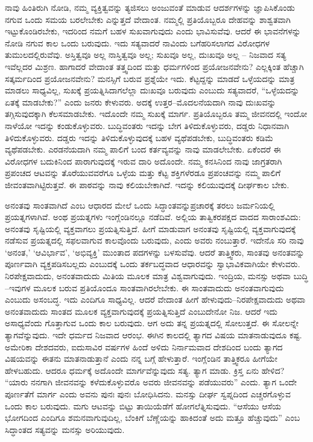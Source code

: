 ನಾವು ಹಿಂತಿರುಗಿ ನೋಡಿ, ನಮ್ಮ ವ್ಯಕ್ತಿತ್ವವನ್ನು ತ್ಯಜಿಸಲು ಅಂಜುವಂತೆ ಮಾಡುವ ಆದರ್ಶಗಳನ್ನು ಜ್ಞಾಪಿಸಿಕೊಂಡು ನಗುವ ಒಂದು ಸಮಯ ಬರಲೇಬೇಕು ಎನ್ನುತ್ತದೆ ವೇದಾಂತ. ನಮ್ಮಲ್ಲಿ ಪ್ರತಿಯೊಬ್ಬರೂ ದೇಹವನ್ನು ಶಾಶ್ವತವಾಗಿ ಇಟ್ಟುಕೊಂಡಿರಬೇಕು, ಇದರಿಂದ ನಮಗೆ ಬಹಳ ಸುಖವಾಗುವುದು ಎಂದು ಭಾವಿಸುವೆವು. ಆದರೆ ಈ ಭಾವನೆಗಳನ್ನು ನೋಡಿ ನಗುವ ಕಾಲ ಒಂದು ಬರುವುದು. ಇದು ಸತ್ಯವಾದರೆ ನಾವಿಂದು ಬಗೆಹರಿಸಲಾಗದ ವಿರೋಧಗಳ ತುಮುಲದಲ್ಲಿರುವೆವು. ಅಸ್ತಿತ್ವವೂ ಅಲ್ಲ ನಾಸ್ತಿತ್ವವೂ ಅಲ್ಲ; ಸುಖವೂ ಅಲ್ಲ, ದುಃಖವೂ ಅಲ್ಲ – ನಿಜವಾದ ಸತ್ಯ ಇವೆಲ್ಲದರ ಮಿಶ್ರಣ. ಹಾಗಾದರೆ ವೇದಾಂತ ತತ್ತ್ವದಿಂದ ಮತ್ತು ಧರ್ಮಗಳಿಂದ ಪ್ರಯೋಜನವೇನು? ಎಲ್ಲಕ್ಕಿಂತ ಹೆಚ್ಚಾಗಿ ಸತ್ಕರ್ಮದಿಂದ ಪ್ರಯೋಜನವೇನು? ಮನಸ್ಸಿಗೆ ಬರುವ ಪ್ರಶ್ನೆಯೇ ಇದು. ಕೆಟ್ಟದ್ದನ್ನು ಮಾಡದೆ ಒಳ್ಳೆಯದನ್ನು ಮಾತ್ರ ಮಾಡಲು ಸಾಧ್ಯವಿಲ್ಲ, ಸುಖಕ್ಕೆ ಪ್ರಯತ್ನಿಸಿದಾಗಲೆಲ್ಲಾ ದುಃಖವೂ ಬರುವುದು ಎಂಬುದು ಸತ್ಯವಾದರೆ, “ಒಳ್ಳೆಯದನ್ನು ಏತಕ್ಕೆ ಮಾಡಬೇಕು?” ಎಂದು ಜನರು ಕೇಳುವರು. ಅದಕ್ಕೆ ಉತ್ತರ–ಮೊದಲನೆಯದಾಗಿ ನಾವು ದುಃಖವನ್ನು ತಗ್ಗಿಸುವುದಕ್ಕಾಗಿ ಕೆಲಸಮಾಡಬೇಕು. ಇದೊಂದೇ ನಮ್ಮ ಸುಖಕ್ಕೆ ಮಾರ್ಗ. ಪ್ರತಿಯೊಬ್ಬರೂ ತಮ್ಮ ಜೀವನದಲ್ಲಿ ಇಂದೋ ನಾಳೆಯೋ ಇದನ್ನು ಕಂಡುಕೊಳ್ಳುವರು. ಬುದ್ಧಿವಂತರು ಇದನ್ನು ಬೇಗ ತಿಳಿದುಕೊಳ್ಳುವರು, ದಡ್ಡರು ನಿಧಾನವಾಗಿ ತಿಳಿದುಕೊಳ್ಳುವರು. ದಡ್ಡರು ಇದನ್ನು ತಿಳಿದುಕೊಳ್ಳುವುದಕ್ಕೆ ಬಹಳ ವ್ಯಥೆಪಡಬೇಕು, ಬುದ್ಧಿವಂತರು ಕಡಿಮೆ ವ್ಯಥೆಪಡಬೇಕು. ಎರಡನೆಯದಾಗಿ ನಮ್ಮ ಪಾಲಿಗೆ ಬಂದ ಕರ್ತವ್ಯವನ್ನು ನಾವು ಮಾಡಲೇಬೇಕು. ಏಕೆಂದರೆ ಈ ವಿರೋಧಗಳ ಬದುಕಿನಿಂದ ಪಾರಾಗುವುದಕ್ಕೆ ಇರುವ ದಾರಿ ಅದೊಂದೇ. ನಮ್ಮ ಕನಸಿನಿಂದ ನಾವು ಜಾಗ್ರತರಾಗಿ ಪ್ರಪಂಚದ ಆಟವನ್ನು ತೊರೆಯುವವರೆಗೂ ಒಳ್ಳೆಯ ಮತ್ತು ಕೆಟ್ಟ ಶಕ್ತಿಗಳೆರಡೂ ಪ್ರಪಂಚವನ್ನು ನಮ್ಮ ಪಾಲಿಗೆ ಜೀವಂತವಾಗಿಟ್ಟಿರುತ್ತವೆ. ಈ ಪಾಠವನ್ನು ನಾವು ಕಲಿಯಬೇಕಾಗಿದೆ. ಇದನ್ನು ಕಲಿಯುವುದಕ್ಕೆ ದೀರ್ಘಕಾಲ ಬೇಕು.


ಅನಂತವು ಸಾಂತವಾಗಿದೆ ಎಂಬ ಆಧಾರದ ಮೇಲೆ ಒಂದು ಸಿದ್ಧಾಂತವನ್ನು\break ಪ್ರಚಾರಕ್ಕೆ ತರಲು ಜರ್ಮನಿಯಲ್ಲಿ ಪ್ರಯತ್ನಗಳಾಗಿವೆ. ಅಂಥ ಪ್ರಯತ್ನಗಳು ಇಂಗ್ಲೆಂಡಿನಲ್ಲೂ ನಡೆದಿವೆ. ಅಲ್ಲಿಯ ತಾತ್ವಿಕರಪಕ್ಷದ ವಾದದ ಸಾರಾಂಶವಿದು: ಅನಂತವು ಸೃಷ್ಟಿಯಲ್ಲಿ ವ್ಯಕ್ತವಾಗಲು ಪ್ರಯತ್ನಿಸುತ್ತಿದೆ. ಹೀಗೆ ಮಾಡುವಾಗ ಅನಂತವು ಸೃಷ್ಟಿಯಲ್ಲಿ ವ್ಯಕ್ತವಾಗುವುದಕ್ಕೆ ನಡೆಸುವ ಪ್ರಯತ್ನದಲ್ಲಿ ಸಫಲವಾಗುವ ಕಾಲವೊಂದು ಬರುವುದು, ಎಂದು ಅವರು ನಂಬುತ್ತಾರೆ. ಇದೇನೊ ಸರಿ ನಾವು ‘ಅನಂತ,’ ‘ಆವಿರ್ಭಾವ’, ‘ಅಭಿವ್ಯಕ್ತಿ’ ಮುಂತಾದ ಪದಗಳನ್ನು ಬಳಸುವೆವು. ಆದರೆ ತಾತ್ತ್ವಿಕರು, ಸಾಂತವು ಅನಂತವನ್ನು ಪೂರ್ಣವಾಗಿ ವ್ಯಕ್ತಪಡಿಸಬಲ್ಲದು ಎಂಬುದಕ್ಕೆ ಒಂದು ತರ್ಕಬದ್ಧವಾದ ಆಧಾರವನ್ನು ಸ್ವಾಭಾವಿಕವಾಗಿಯೇ ಕೇಳುವರು. ನಿರಪೇಕ್ಷವಾದುದು, ಅನಂತವಾದುದು ಮಿತಿಯ ಮೂಲಕ ಮಾತ್ರ ವಿಶ್ವವಾಗುವುದು. ಇಂದ್ರಿಯ, ಮನಸ್ಸು ಅಥವಾ ಬುದ್ಧಿ –ಇವುಗಳ ಮೂಲಕ ಬರುವ ಪ್ರತಿಯೊಂದೂ ಸಾಂತವಾಗಿರಲೇಬೇಕು. ಈ ಸಾಂತವಾದುದು ಅನಂತವಾಗುವುದು ಎಂಬುದು ಅಸಂಬದ್ಧ. ಇದು ಎಂದಿಗೂ ಸಾಧ್ಯವಿಲ್ಲ. ಆದರೆ ವೇದಾಂತ ಹೀಗೆ ಹೇಳುವುದು–ನಿರಪೇಕ್ಷವಾದುದು ಅಥವಾ ಅನಂತವಾದುದು ಸಾಂತದ ಮೂಲಕ ವ್ಯಕ್ತವಾಗುವುದಕ್ಕೆ ಪ್ರಯತ್ನಿಸುತ್ತಿದೆ ಎಂಬುದೇನೋ ನಿಜ. ಆದರೆ ಇದು ಅಸಾಧ್ಯವೆಂದು ಗೊತ್ತಾಗುವ ಒಂದು ಕಾಲ ಬರುವುದು. ಆಗ ಅದು ತನ್ನ ಪ್ರಯತ್ನದಲ್ಲಿ ಸೋಲುತ್ತದೆ. ಈ ಸೋಲನ್ನೇ ತ್ಯಾಗವೆನ್ನುವುದು. ಇದೇ ಧರ್ಮದ ನಿಜವಾದ ಆರಂಭ. ಈಗಿನ ಕಾಲದಲ್ಲಿ ತ್ಯಾಗದ ವಿಷಯ ಮಾತನಾಡುವುದೂ ಕಷ್ಟ. ಅಮೇರಿಕಾ ದೇಶದವರು, ಐದುಸಾವಿರ ವರ್ಷಗಳ ಹಿಂದೆ ಅಳಿದು ನಿರ್ನಾಮವಾದ ದೇಶದಿಂದ ಬಂದು ತ್ಯಾಗದ ವಿಷಯವನ್ನು ಈತನು ಮಾತನಾಡುತ್ತಾನೆ ಎಂದು ನನ್ನ ಬಗ್ಗೆ ಹೇಳುತ್ತಾರೆ. ಇಂಗ್ಲೆಂಡಿನ ತಾತ್ತ್ವಿಕರೂ ಹೀಗೆಯೇ ಹೇಳಬಹುದು. ಆದರೂ ಧರ್ಮಕ್ಕೆ ಅದೊಂದೇ ಮಾರ್ಗವೆನ್ನುವುದು ಸತ್ಯ. ತ್ಯಾಗ ಮಾಡು. ಕ್ರಿಸ್ತ ಏನು ಹೇಳಿದ? “ಯಾರು ನನಗಾಗಿ ಜೀವನವನ್ನು ಕಳೆದುಕೊಳ್ಳುವರೊ ಅವರು ಜೀವನವನ್ನು ಪಡೆಯುವರು” ಎಂದು. ತ್ಯಾಗ ಒಂದೇ ಪೂರ್ಣತೆಗೆ ಮಾರ್ಗ ಎಂದು ಅವನು ಪುನಃ ಪುನಃ ಬೋಧಿಸಿದನು. ಮನಸ್ಸು ದೀರ್ಘ ಸ್ವಪ್ನದಿಂದ ಎಚ್ಚರಗೊಳ್ಳುವ ಒಂದು ಕಾಲ ಬರುವುದು. ಮಗು ಆಟವನ್ನು ಬಿಟ್ಟು ತಾಯಿಯೆಡೆಗೆ ಹೋಗಲೆತ್ನಿಸುವುದು. “ಆಸೆಯು ಆಸೆಯ ಭೋಗದಿಂದ ಎಂದಿಗೂ ಶಮನವಾಗುವುದಿಲ್ಲ, ಬೆಂಕಿಗೆ ಬೆಣ್ಣೆಯನ್ನು ಹಾಕಿದಂತೆ ಅದು ಮತ್ತೂ ಹೆಚ್ಚುವುದು” ಎಂಬ ಸಿದ್ಧಾಂತದ ಸತ್ಯವನ್ನು ಮನಸ್ಸು ಅರಿಯುವುದು.




